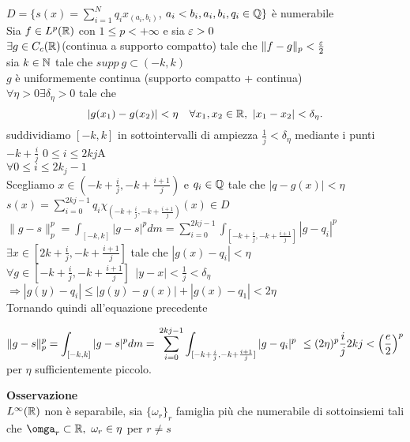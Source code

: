 \documentclass[12px]{article}
\begin{document}
	 \begin{dimo}
		 $D = \{s(x) = \sum^{N}_{i=1}q_ix_{(a_i,b_i)}$, $a_i < b_i, a_i,b_i,q_i\in \mathbb{Q}\}$ è numerabile\\
		 Sia $f\in L^p(\mathbb{R})$ con  $1\leq p < +\infty$ e sia $\varepsilon > 0 $\\
		  $\exists g\in C_c(\mathbb{R}) $(continua a supporto compatto) tale che  $\|f-g\|_p < \frac {\varepsilon} 2$\\
		  sia  $k\in \mathbb{N}$ tale che  $supp \ g\subset (-k,k)$\\
		   $g$ è uniformemente continua \hfill(supporto compatto + continua)\\
		   $\forall \eta > 0 \exists \delta_\eta > 0 $ tale che 
		    \[
		   |g(x_1)-g(x_2)| <\eta \ \ \ \forall x_1,x_2\in \R , \ |x_1-x_2| < \delta_\eta
		   .\] 
		   suddividiamo $[-k,k]$ in sottointervalli di ampiezza  $\frac 1j < \delta_\eta$ mediante i punti  $-k + \frac i j$  $0\leq i \leq 2kj$A\\
		    $\forall 0 \leq i \leq 2k_j -1$\\
		    Scegliamo  $x\in (-k + \frac i j, -k + \frac { i + 1}j)$ e $q_i\in \mathbb{Q}$ tale che  $|q-g(x)| < \eta$\\
		    $s(x) = \sum^{2kj - 1}_{i = 0}q_i\chi_{(-k + \frac  i j, -k + \frac {i+1}j)}(x)\in D$\\
		    $\displaystyle\|g-s\|^p_p = \int_{[-k,k]}|g-s|^pd m = \sum^{2kj -1}_{i=0}\int_{[-k+\frac ij, -k + \frac {i+1}j]}|g-q_i|^p$ \\
		    $\exists x\in [2k + \frac ij, -k + \frac {i+1}j]$ tale che  $|g(x) - q_i| < \eta$\\
		    $\forall g\in [-k + \frac ij, -k + \frac {i + 1}j] \ \ |y-x | < \frac 1 j < \delta_\eta$\\
		     $ \Rightarrow  |g(y)-q_i| \leq |g(y)-g(x)| +|g(x)-q_1| < 2\eta$ \\
		     Tornando quindi all'equazione precedente

		    $\displaystyle\|g-s\|^p_p = \int_{[-k,k]}|g-s|^pd m = \\\sum^{2kj -1}_{i=0}\int_{[-k+\frac ij, -k + \frac {i+1}j]}|g-q_i|^p\ \leq (2\eta)^p\frac ij 2kj < \left(\frac e 2 \right)^p$  per $\eta$ sufficientemente piccolo.
			    
	 \end{dimo}
	 \textbf{Osservazione}\\
	 $L^\infty(\mathbb{R})$ non è separabile, sia  $\{\omega_r\}_r$ famiglia più che numerabile di sottoinsiemi tali che  $\omga_r\subset \R, \ \omega_r\in\eta$ per  $r\neq s$\\
\end{document}
